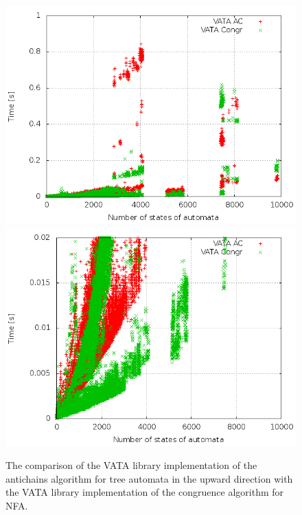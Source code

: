 \begin{figure}[bt]
\begin{center}
\includegraphics[scale=0.33]{fig/plot_ac_zprava.png}
\includegraphics[scale=0.33]{fig/plot_ac_step_zprava.png}
\caption{The comparison of the VATA library implementation of the antichains algorithm for tree automata in the upward direction
    with the VATA library implementation of the congruence algorithm for NFA.}
\label{fig:figPlotAc}
\end{center}
\end{figure}

